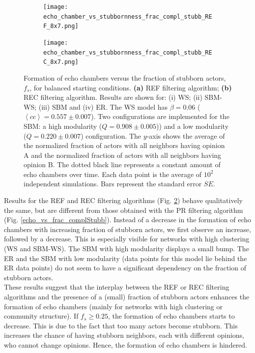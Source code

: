 \documentclass[11 pt , letterpaper , twoside , openright]{book}
\begin{document}
\begin{figure}[H]
  \begin{subfigure}[t]{0.49\textwidth}
    \caption{}
  	\texttt{[image: echo\_chamber\_vs\_stubbornness\_frac\_compl\_stubb\_REF\_8x7.png]}
  \end{subfigure}
  \begin{subfigure}[t]{0.49\textwidth}
    \caption{}
  	\texttt{[image: echo\_chamber\_vs\_stubbornness\_frac\_compl\_stubb\_REC\_8x7.png]}
    \label{REC_frac_compl_stubb}
  \end{subfigure}
  \captionsetup{format=plain}
  \caption[Formation of echo chambers versus fraction of stubborn actors for the REF and REC filtering algorithms and balanced starting conditions.]{Formation of echo chambers versus the fraction of stubborn actors, $f_s$, for balanced starting conditions. \textbf{(a)} REF filtering algorithm; \textbf{(b)} REC filtering algorithm. Results are shown for: (i) WS; (ii) SBM-WS; (iii) SBM and (iv) ER. The WS model has $\beta = 0.06$ ($\left<cc\right> = 0.557 \pm 0.007$). Two configurations are implemented for the SBM: a high modularity ($Q = 0.908 \pm 0.005$)) and a low modularity ($Q = 0.220 \pm 0.007$) configuration. The $y$-axis shows the average of the normalized fraction of actors with all neighbors having opinion A and the normalized fraction of actors with all neighbors having opinion B. The dotted black line represents a constant amount of echo chambers over time. Each data point is the average of $10^2$ independent simulations. Bars represent the standard error $SE$.}
\label{echo_vs_frac_complStubb_REF-REC}
\end{figure}
\noindent
Results for the REF and REC filtering algorithms (Fig. \ref{echo_vs_frac_complStubb_REF-REC}) behave qualitatively the same, but are different from those obtained with the PR filtering algorithm (Fig. \ref{echo_vs_frac_complStubb}). Instead of a decrease in the formation of echo chambers with increasing fraction of stubborn actors, we first observe an increase, followed by a decrease. This is especially visible for networks with high clustering (WS and SBM-WS). The SBM with high modularity displays a small bump. The ER and the SBM with low modularity (data points for this model lie behind the ER data points) do not seem to have a significant dependency on the fraction of stubborn actors.\\
\newline
These results suggest that the interplay between the REF or REC filtering algorithms and the presence of a (small) fraction of stubborn actors enhances the formation of echo chambers (mainly for networks with high clustering or community structure). If $f_s \geqslant 0.25$, the formation of echo chambers starts to decrease. This is due to the fact that too many actors become stubborn. This increases the chance of having stubborn neighbors, each with different opinions, who cannot change opinions. Hence, the formation of echo chambers is hindered.\\
\end{document}
